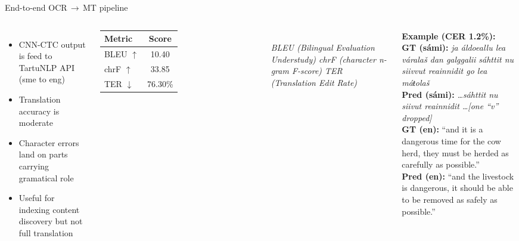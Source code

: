 \documentclass[aspectratio=169,11pt]{beamer}
\newcommand{\bleuScore}{10.40}
\newcommand{\chrfScore}{33.85}
\newcommand{\terScore}{76.30}
\begin{document}
\begin{frame}{End-to-end OCR\,$\rightarrow$\,MT pipeline}
  \smallskip
  \begin{columns}[T,onlytextwidth]
      \begin{itemize}
        \item CNN-CTC output is feed to TartuNLP API (sme to eng)
        \item Translation accuracy is moderate
        \item Character errors land on parts carrying gramatical role
        \item Useful for indexing content discovery but not full translation
      \end{itemize}

      \centering
      \footnotesize
      \begin{tabular}{lc}
        \toprule
        \textbf{Metric} & \textbf{Score} \\
        \midrule
        BLEU $\uparrow$ & \bleuScore{} \\
        chrF $\uparrow$ & \chrfScore{} \\
        TER  $\downarrow$ & \terScore{}\% \\
        \bottomrule
      \end{tabular}\\[2pt]
      {\scriptsize\textit{BLEU (Bilingual Evaluation Understudy) chrF (character n-gram F-score) TER (Translation Edit Rate)}}
      \medskip\\
      \raggedright
      \textbf{Example (CER 1.2\%):}\\[2pt]
      \scriptsize
      \textbf{GT (s\'{a}mi):} \emph{ja \'{a}ldoeallu lea v\'{a}rala\v{s} dan galggalii s\'{a}httit nu \alert{siivvut} reainnidit go lea m\'{a}ŧola\v{s}}\\[1pt]
      \textbf{Pred (s\'{a}mi):} \emph{\dots s\'{a}httit nu \alert{siivut} reainnidit \dots}\hfill\textit{[one ``v'' dropped]}\\[6pt]
      \textbf{GT (en):} ``and it is a \alert{dangerous time for the cow herd}, they must be \alert{herded} as carefully as possible.''\\[2pt]
      \textbf{Pred (en):} ``and \alert{the livestock is dangerous}, it should be able to be \alert{removed} as safely as possible.''

     \end{columns}
\end{frame}
\end{document}
